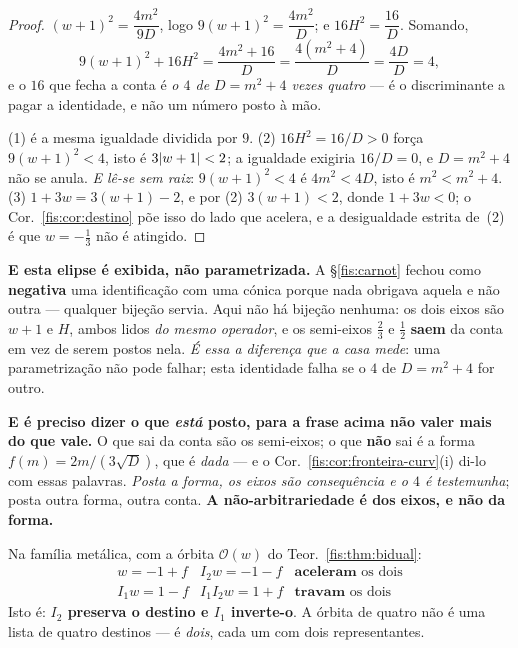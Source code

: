 \documentclass[livro.tex]{subfiles}
\begin{document}
\begin{proof}
$(w+1)^{2}=\dfrac{4m^{2}}{9D}$, logo $9(w+1)^{2}=\dfrac{4m^{2}}{D}$; e
$16H^{2}=\dfrac{16}{D}$. Somando,
\[
9(w+1)^{2}+16H^{2}=\frac{4m^{2}+16}{D}=\frac{4(m^{2}+4)}{D}=\frac{4D}{D}=4 ,
\]
e o $16$ que fecha a conta é \emph{o $4$ de $D=m^{2}+4$ vezes quatro} --- é o
discriminante a pagar a identidade, e não um número posto à mão.

(1) é a mesma igualdade dividida por $9$. (2) $16H^{2}=16/D>0$ força
$9(w+1)^{2}<4$, isto é $3\lvert w+1\rvert<2$; a igualdade exigiria $16/D=0$, e
$D=m^{2}+4$ não se anula. \emph{E lê-se sem raiz}: $9(w+1)^{2}<4$ é $4m^{2}<4D$,
isto é $m^{2}<m^{2}+4$. (3) $1+3w=3(w+1)-2$, e por (2) $3(w+1)<2$, donde
$1+3w<0$; o Cor.~\ref{fis:cor:destino} põe isso do lado que acelera, e a
desigualdade estrita de~(2) é que $w=-\tfrac13$ não é atingido.
\end{proof}

\medskip\noindent\textbf{E esta elipse é exibida, não parametrizada.} A
§\ref{fis:carnot} fechou como \textbf{negativa} uma identificação com uma cónica
porque nada obrigava aquela e não outra --- qualquer bijeção servia. Aqui não há
bijeção nenhuma: os dois eixos são $w+1$ e $H$, ambos lidos \emph{do mesmo
operador}, e os semi-eixos $\tfrac23$ e $\tfrac12$ \textbf{saem} da conta em vez
de serem postos nela. \emph{É essa a diferença que a casa mede}: uma
parametrização não pode falhar; esta identidade falha se o $4$ de $D=m^{2}+4$ for
outro.

\smallskip\noindent\textbf{E é preciso dizer o que \emph{está} posto, para a
frase acima não valer mais do que vale.} O que sai da conta são os semi-eixos; o
que \textbf{não} sai é a forma $f(m)=2m/(3\sqrt D)$, que é \emph{dada} --- e o
Cor.~\ref{fis:cor:fronteira-curv}(i) di-lo com essas palavras. \emph{Posta a
forma, os eixos são consequência e o $4$ é testemunha}; posta outra forma,
outra conta. \textbf{A não-arbitrariedade é dos eixos, e não da forma.}

\begin{corolario}\label{fis:cor:destino-orbita}
Na família metálica, com a órbita $\mathcal{O}(w)$ do Teor.~\ref{fis:thm:bidual}:
\[
\begin{array}{lll}
w=-1+f & I_2w=-1-f & \textbf{aceleram} \text{ os dois}\\[2pt]
I_1w=1-f & I_1I_2w=1+f & \textbf{travam} \text{ os dois}
\end{array}
\]
Isto é: \textbf{$I_2$ preserva o destino e $I_1$ inverte-o}. A órbita de quatro
não é uma lista de quatro destinos --- é \emph{dois}, cada um com dois
representantes.
\end{corolario}
\end{document}
